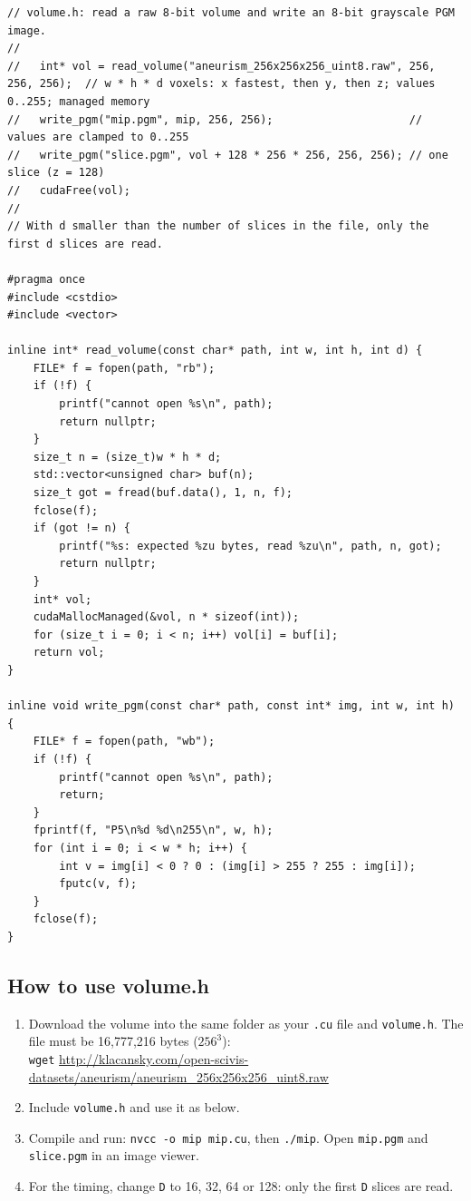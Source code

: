 \documentclass[main.tex]{subfiles}
\begin{document}
\begin{lstlisting}[language=CUDA]
// volume.h: read a raw 8-bit volume and write an 8-bit grayscale PGM image.
//
//   int* vol = read_volume("aneurism_256x256x256_uint8.raw", 256, 256, 256);  // w * h * d voxels: x fastest, then y, then z; values 0..255; managed memory
//   write_pgm("mip.pgm", mip, 256, 256);                     // values are clamped to 0..255
//   write_pgm("slice.pgm", vol + 128 * 256 * 256, 256, 256); // one slice (z = 128)
//   cudaFree(vol);
//
// With d smaller than the number of slices in the file, only the first d slices are read.

#pragma once
#include <cstdio>
#include <vector>

inline int* read_volume(const char* path, int w, int h, int d) {
    FILE* f = fopen(path, "rb");
    if (!f) {
        printf("cannot open %s\n", path);
        return nullptr;
    }
    size_t n = (size_t)w * h * d;
    std::vector<unsigned char> buf(n);
    size_t got = fread(buf.data(), 1, n, f);
    fclose(f);
    if (got != n) {
        printf("%s: expected %zu bytes, read %zu\n", path, n, got);
        return nullptr;
    }
    int* vol;
    cudaMallocManaged(&vol, n * sizeof(int));
    for (size_t i = 0; i < n; i++) vol[i] = buf[i];
    return vol;
}

inline void write_pgm(const char* path, const int* img, int w, int h) {
    FILE* f = fopen(path, "wb");
    if (!f) {
        printf("cannot open %s\n", path);
        return;
    }
    fprintf(f, "P5\n%d %d\n255\n", w, h);
    for (int i = 0; i < w * h; i++) {
        int v = img[i] < 0 ? 0 : (img[i] > 255 ? 255 : img[i]);
        fputc(v, f);
    }
    fclose(f);
}
\end{lstlisting}

\subsection{How to use volume.h}
\begin{enumerate}[nosep]
  \item Download the volume into the same folder as your \texttt{.cu} file and \texttt{volume.h}. The file must be 16,777,216 bytes ($256^3$):\\
    \texttt{wget} \url{http://klacansky.com/open-scivis-datasets/aneurism/aneurism_256x256x256_uint8.raw}
  \item Include \texttt{volume.h} and use it as below.
  \item Compile and run: \texttt{nvcc -o mip mip.cu}, then \texttt{./mip}. Open \texttt{mip.pgm} and \texttt{slice.pgm} in an image viewer.
  \item For the timing, change \texttt{D} to 16, 32, 64 or 128: only the first \texttt{D} slices are read.
\end{enumerate}
\end{document}
